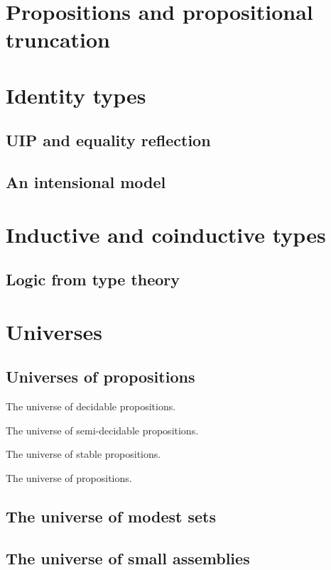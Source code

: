 \section{Propositions and propositional truncation}
\label{sec:prop-trunc}




\section{Identity types}
\label{sec:identity-types}

\subsection{UIP and equality reflection}
\label{sec:uip-equal-refl}

\subsection{An intensional model}
\label{sec:an-intensional-model}



\section{Inductive and coinductive types}
\label{sec:inductive-counductive-types}


\subsection{Logic from type theory}
\label{sec:logic-from-type}

\section{Universes}
\label{sec:universes}

\subsection{Universes of propositions}
\label{sec:universe-propositions}

The universe of decidable propositions.

The universe of semi-decidable propositions.

The universe of stable propositions.

The universe of propositions.

\subsection{The universe of modest sets}
\label{sec:universe-modest-sets}

\subsection{The universe of small assemblies}
\label{sec:univ-small-assembl}



